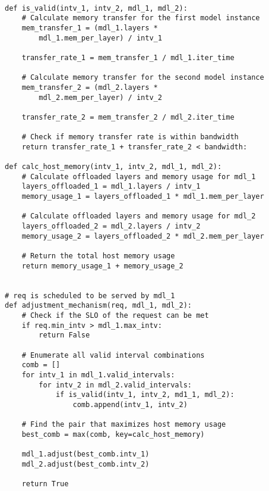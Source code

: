 \begin{verbatim}

def is_valid(intv_1, intv_2, mdl_1, mdl_2):
    # Calculate memory transfer for the first model instance
    mem_transfer_1 = (mdl_1.layers * 
        mdl_1.mem_per_layer) / intv_1
        
    transfer_rate_1 = mem_transfer_1 / mdl_1.iter_time
    
    # Calculate memory transfer for the second model instance
    mem_transfer_2 = (mdl_2.layers * 
        mdl_2.mem_per_layer) / intv_2

    transfer_rate_2 = mem_transfer_2 / mdl_2.iter_time

    # Check if memory transfer rate is within bandwidth
    return transfer_rate_1 + transfer_rate_2 < bandwidth:

def calc_host_memory(intv_1, intv_2, mdl_1, mdl_2):
    # Calculate offloaded layers and memory usage for mdl_1
    layers_offloaded_1 = mdl_1.layers / intv_1
    memory_usage_1 = layers_offloaded_1 * mdl_1.mem_per_layer

    # Calculate offloaded layers and memory usage for mdl_2
    layers_offloaded_2 = mdl_2.layers / intv_2
    memory_usage_2 = layers_offloaded_2 * mdl_2.mem_per_layer

    # Return the total host memory usage
    return memory_usage_1 + memory_usage_2


# req is scheduled to be served by mdl_1
def adjustment_mechanism(req, mdl_1, mdl_2):
    # Check if the SLO of the request can be met
    if req.min_intv > mdl_1.max_intv:
        return False

    # Enumerate all valid interval combinations
    comb = []
    for intv_1 in mdl_1.valid_intervals:
        for intv_2 in mdl_2.valid_intervals:
            if is_valid(intv_1, intv_2, md1_1, mdl_2):
                comb.append(intv_1, intv_2)
    
    # Find the pair that maximizes host memory usage
    best_comb = max(comb, key=calc_host_memory)
    
    mdl_1.adjust(best_comb.intv_1)
    mdl_2.adjust(best_comb.intv_2)

    return True

\end{verbatim}
